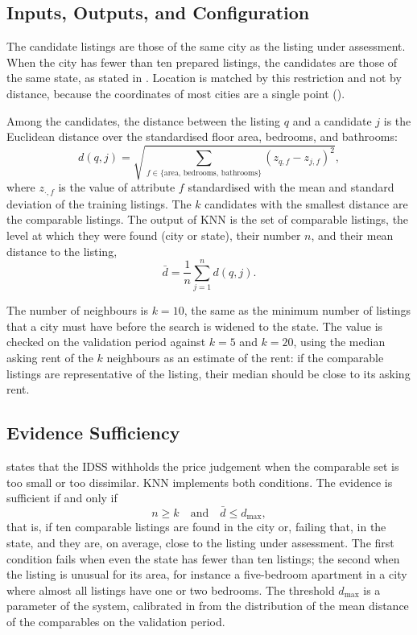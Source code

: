 \documentclass[12pt,a4paper]{report}
\begin{document}
\subsection{Inputs, Outputs, and Configuration}

The candidate listings are those of the same city as the listing under
assessment. When the city has fewer than ten prepared listings, the
candidates are those of the same state, as stated in
. Location is matched by this restriction and not
by distance, because the coordinates of most cities are a single point
().

Among the candidates, the distance between the listing $q$ and a candidate
$j$ is the Euclidean distance over the standardised floor area, bedrooms,
and bathrooms:
\begin{equation}
  d(q, j) = \sqrt{\sum_{f \in \{\text{area},\,\text{bedrooms},\,\text{bathrooms}\}}
  \left( z_{q,f} - z_{j,f} \right)^2 },
  \label{eq:knn-distance}
\end{equation}
where $z_{\cdot,f}$ is the value of attribute $f$ standardised with the mean
and standard deviation of the training listings. The $k$ candidates with the
smallest distance are the comparable listings. The output of KNN is the set
of comparable listings, the level at which they were found (city or state),
their number $n$, and their mean distance to the listing,
\begin{equation}
  \bar{d} = \frac{1}{n} \sum_{j=1}^{n} d(q, j).
  \label{eq:mean-distance}
\end{equation}

The number of neighbours is $k = 10$, the same as the minimum number of
listings that a city must have before the search is widened to the state.
The value is checked on the validation period against $k = 5$ and $k = 20$,
using the median asking rent of the $k$ neighbours as an estimate of the
rent: if the comparable listings are representative of the listing, their
median should be close to its asking rent.

\subsection{Evidence Sufficiency}
\label{sec:evidence-sufficiency}

 states that the IDSS withholds the price judgement when
the comparable set is too small or too dissimilar. KNN implements both
conditions. The evidence is sufficient if and only if
\begin{equation}
  n \geq k \quad \text{and} \quad \bar{d} \leq d_{\max},
  \label{eq:sufficiency}
\end{equation}
that is, if ten comparable listings are found in the city or, failing that,
in the state, and they are, on average, close to the listing under
assessment. The first condition fails when even the state has fewer than ten
listings; the second when the listing is unusual for its area, for instance
a five-bedroom apartment in a city where almost all listings have one or
two bedrooms. The threshold $d_{\max}$ is a parameter of the system,
calibrated in  from the distribution of the mean
distance of the comparables on the validation period.
\end{document}
